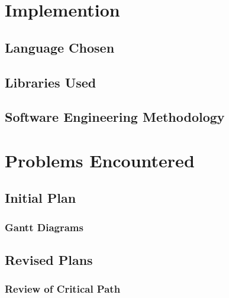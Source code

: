 \documentclass[a4paper,12pt]{report}
\begin{document}



\chapter{Implemention}

\section{Language Chosen}



\section{Libraries Used}



\section{Software Engineering Methodology}




\chapter{Problems Encountered}

\section{Initial Plan}



\pagebreak

\subsection{Gantt Diagrams}

\todo

\section{Revised Plans}



\subsection{Review of Critical Path}

\todo
\end{document}
